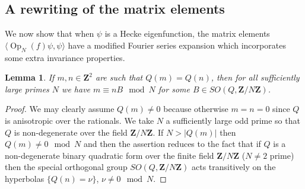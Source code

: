 \documentclass[12pt]{amsart}
\newtheorem{lem}[thm]{Lemma}%
\theoremstyle{plain}
\newcommand{\Z}{{\mathbf Z}}
\newcommand{\TN}{T_N}  %
\newcommand{\OPN}{\operatorname{Op}_N}
\newcommand{\torusN}{C(2N)}%
\renewcommand{\^}{\widehat}
\newcommand{\vnn}{\nu}
\begin{document}
\subsection{A rewriting of the matrix elements} 
We now show that when $\psi$ is a Hecke eigenfunction, the matrix 
elements $\langle\OPN(f)\psi,\psi \rangle$ have a modified Fourier
series expansion   which incorporates some extra invariance
properties. 



\begin{lem}\label{lem:finite-support-equality}
If  $m,n\in \Z^2$ are such that
$Q(m)=Q(n)$, then for all sufficiently large primes $N$ we have 
$m\equiv nB \mod N$ for some $B\in SO(Q,\Z/N\Z)$. 
\end{lem}
\begin{proof}
We may clearly assume $Q(m)\neq 0$ because otherwise $m=n=0$ since $Q$
is anisotropic over the rationals. We take $N$ a sufficiently
large odd prime so that $Q$ is non-degenerate over the field $\Z/N\Z$. 
If $N> |Q(m)|$ then 
$Q(m)\neq 0\mod N$ and then the assertion reduces  to the 
fact that if $Q$ is a non-degenerate binary quadratic form 
over the finite field $\Z/N\Z$ ($N\neq 2$ prime)  then the 
special orthogonal group  $SO(Q,\Z/N\Z)$ acts transitively on the hyperbolas
$\{Q(n)=\vnn\}$, $\vnn\neq 0\mod N$. 
\end{proof}


%
\end{document}
